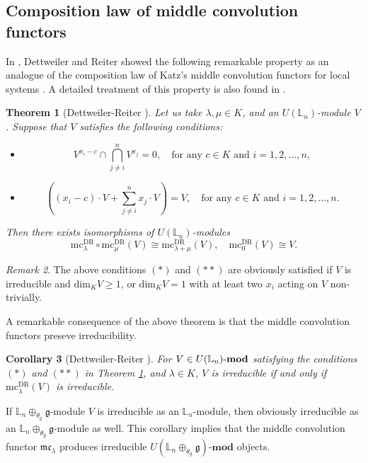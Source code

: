 \documentclass[a4paper,12pt]{article}
\newtheorem{thm}{Theorem}[section]
\newtheorem{cor}[thm]{Corollary}
\theoremstyle{definition}
\theoremstyle{remark}
\newtheorem{rem}[thm]{Remark}
\begin{document}
\subsection{Composition law of middle convolution functors}
In \cite{DR00,DR07}, Dettweiler and Reiter showed the following remarkable property
as an analogue of the composition law of Katz's middle convolution functors for local systems \cite{Katz}.
A detailed treatment of this property is also found in \cite{Harbook}.
\begin{thm}[Dettweiler-Reiter \cite{DR00,DR07}]\label{thm:compmcDR}
Let us take $\lambda,\mu\in K$, and an $U(\mathbb{L}_{n})$-module $V$.
Suppose that $V$ satisfies the following conditions:
\begin{itemize}
	\item[$(*)$] 
	\[
		V^{x_{i}-c}\cap \bigcap_{j\neq i}^{n} V^{x_{j}}=0,\quad \text{for any }c\in K\text{ and }i=1,2,\ldots,n,
	\]
	\item[$(**)$] 
	\[
		\left((x_{i}-c)\cdot V+\sum_{j\neq i}^{n} x_{j}\cdot V\right)= V,\quad \text{for any }c\in K\text{ and }i=1,2,\ldots,n.
	\]
\end{itemize}
Then there exists isomorphisms of $U(\mathbb{L}_{n})$-modules
\[
	\mathrm{mc}^{\mathrm{DR}}_{\lambda}\circ \mathrm{mc}^{\mathrm{DR}}_{\mu}(V)\cong \mathrm{mc}^{\mathrm{DR}}_{\lambda+\mu}(V),\quad \mathrm{mc}^{\mathrm{DR}}_{0}(V)\cong V.
\]
\end{thm}
\begin{rem}
The above conditions $(*)$ and $(**)$ are obviously satisfied if $V$ is irreducible
and $\mathrm{dim}_{K}V\ge 1$, or $\mathrm{dim}_{K}V=1$ with 
at least two $x_i$ acting on $V$ non-trivially.
\end{rem}
A remarkable consequence of the above theorem is that
the middle convolution functors preseve irreducibility.
\begin{cor}[Dettweiler-Reiter \cite{DR00}]\label{cor:compmcDR}
	For $V\in U(\mathbb{L}_{n})\text{-}{\mathrm{\bf{mod}}}$ satisfying the conditions $(*)$ and $(**)$ in Theorem \ref{thm:compmcDR},
	 and $\lambda\in K$, 
	$V$ is irreducible if and only if $\mathrm{mc}^{\mathrm{DR}}_{\lambda}(V)$ is irreducible.
\end{cor}
If $\mathbb{L}_{n}\oplus_{\theta_{g}}\mathfrak{g}$-module 
$V$ is irreducible as an $\mathbb{L}_{n}$-module, then obviously
irreducible as an $\mathbb{L}_{n}\oplus_{\theta_{g}}\mathfrak{g}$-module as well.
This corollary implies that the middle convolution functor
$\mathfrak{mc}_{\lambda}$ produces irreducible 
$U(\mathbb{L}_{n}\oplus_{\theta_{g}}\mathfrak{g})\text{-}\mathbf{mod}$ objects.
\end{document}
